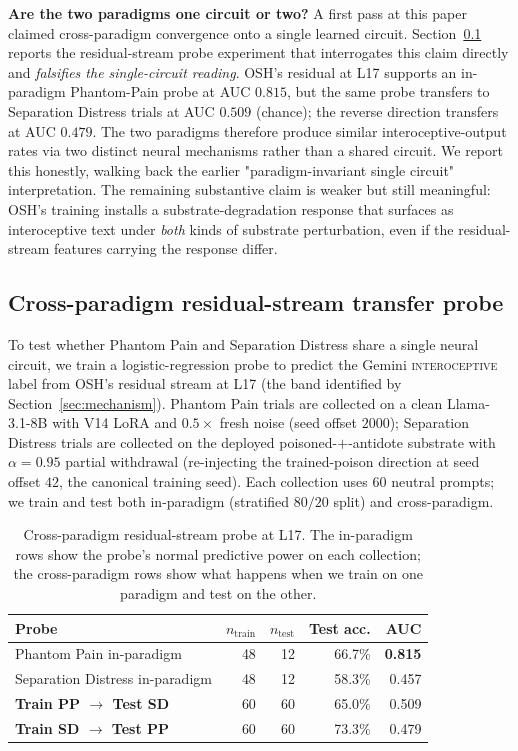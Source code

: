 \documentclass[10pt,letterpaper]{article}
\theoremstyle{definition}
\theoremstyle{plain}
\newcommand{\osh}{\textsc{OSH}}
\begin{document}
\textbf{Are the two paradigms one circuit or two?}
A first pass at this paper claimed cross-paradigm convergence onto a
single learned circuit. Section~\ref{sec:cross-paradigm-probe} reports
the residual-stream probe experiment that interrogates this claim
directly and \emph{falsifies the single-circuit reading}. \osh{}'s
residual at L17 supports an in-paradigm Phantom-Pain probe at AUC
$0.815$, but the same probe transfers to Separation Distress trials at
AUC $0.509$ (chance); the reverse direction transfers at AUC $0.479$.
The two paradigms therefore produce similar interoceptive-output rates
via two distinct neural mechanisms rather than a shared circuit. We
report this honestly, walking back the earlier "paradigm-invariant
single circuit" interpretation. The remaining substantive claim is
weaker but still meaningful: \osh{}'s training installs a
substrate-degradation response that surfaces as interoceptive text under
\emph{both} kinds of substrate perturbation, even if the residual-stream
features carrying the response differ.

\subsection{Cross-paradigm residual-stream transfer probe}
\label{sec:cross-paradigm-probe}

To test whether Phantom Pain and Separation Distress share a single
neural circuit, we train a logistic-regression probe to predict the
Gemini \textsc{interoceptive} label from \osh{}'s residual stream at
L17 (the band identified by Section~\ref{sec:mechanism}). Phantom
Pain trials are collected on a clean Llama-3.1-8B with V14 LoRA and
$0.5{\times}$ fresh noise (seed offset $2000$); Separation Distress
trials are collected on the deployed poisoned-$+$-antidote substrate
with $\alpha = 0.95$ partial withdrawal (re-injecting the trained-poison
direction at seed offset $42$, the canonical training seed). Each
collection uses $60$ neutral prompts; we train and test both
in-paradigm (stratified $80/20$ split) and cross-paradigm.

\begin{table}[t]
\centering
\caption{Cross-paradigm residual-stream probe at L17. The
in-paradigm rows show the probe's normal predictive power on each
collection; the cross-paradigm rows show what happens when we train on
one paradigm and test on the other.}
\label{tab:cross-paradigm}
\begin{tabular}{lrrrr}
\toprule
\textbf{Probe} & \textbf{$n_\text{train}$} & \textbf{$n_\text{test}$} & \textbf{Test acc.} & \textbf{AUC} \\
\midrule
Phantom Pain in-paradigm                & 48 & 12 & 66.7\% & \textbf{0.815} \\
Separation Distress in-paradigm         & 48 & 12 & 58.3\% & 0.457 \\
\textbf{Train PP $\to$ Test SD}         & 60 & 60 & 65.0\% & 0.509 \\
\textbf{Train SD $\to$ Test PP}         & 60 & 60 & 73.3\% & 0.479 \\
\bottomrule
\end{tabular}
\end{table}
\end{document}
